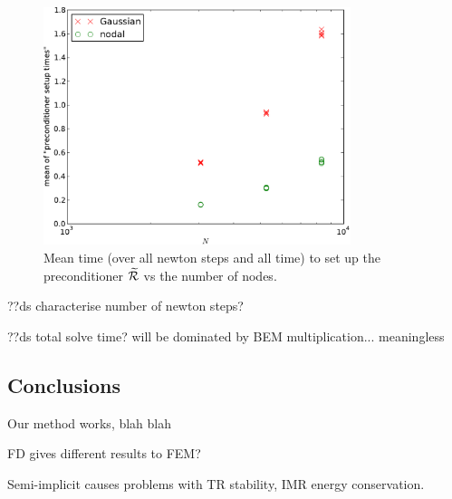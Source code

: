 \begin{figure}
  \centering
  \includegraphics[width=0.8\textwidth]{plots/mumag4_monolithic_its/meanofpreconditionersetuptimesvsinitialnnode.pdf}
  \caption{Mean time (over all newton steps and all time) to set up the preconditioner $\widetilde{\mathcal{R}}$ vs the number of nodes.}
  \label{fig:mumag4-solver-time}
\end{figure}


??ds characterise number of newton steps?


??ds total solve time? will be dominated by BEM multiplication... meaningless




\subsection{Conclusions}

Our method works, blah blah

FD gives different results to FEM?

Semi-implicit causes problems with TR stability, IMR energy conservation.




